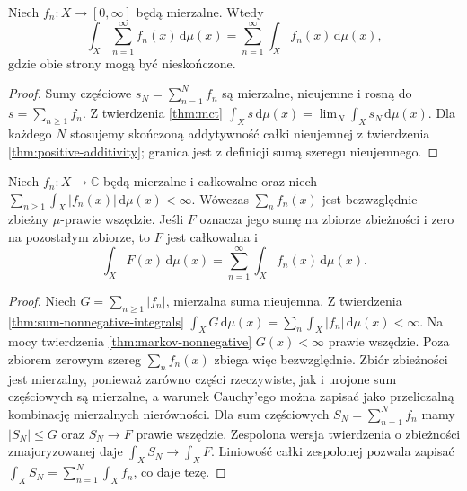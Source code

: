 \begin{twierdzenie}
\label{thm:sum-nonnegative-integrals}
Niech $f_n:X\to[0,\infty]$ będą mierzalne. Wtedy
\begin{equation}\label{eq:sum-nonnegative-integrals}
\int_X\sum_{n=1}^{\infty}f_n(x)\,\mathrm d\mu(x)
=\sum_{n=1}^{\infty}\int_Xf_n(x)\,\mathrm d\mu(x),
\end{equation}
gdzie obie strony mogą być nieskończone.
\end{twierdzenie}
\begin{proof}
Sumy częściowe $s_N=\sum_{n=1}^N f_n$ są
mierzalne, nieujemne i rosną do
$s=\sum_{n\ge1}f_n$. Z twierdzenia \ref{thm:mct}
$\int_Xs\,\mathrm d\mu(x)=\lim_N\int_Xs_N\,\mathrm d\mu(x)$.
Dla każdego $N$ stosujemy skończoną addytywność
całki nieujemnej z twierdzenia
\ref{thm:positive-additivity}; granica jest
z definicji sumą szeregu nieujemnego.
\end{proof}

\begin{twierdzenie}
\label{thm:sum-absolutely-integrable}
Niech $f_n:X\to\mathbb C$ będą mierzalne i
całkowalne oraz niech
$\sum_{n\ge1}\int_X|f_n(x)|\,\mathrm d\mu(x)<\infty$.
Wówczas $\sum_nf_n(x)$ jest bezwzględnie zbieżny
$\mu$-prawie wszędzie. Jeśli $F$ oznacza jego sumę
na zbiorze zbieżności i zero na pozostałym zbiorze,
to $F$ jest całkowalna i
\begin{equation}\label{eq:interchange-series}
\int_XF(x)\,\mathrm d\mu(x)
=\sum_{n=1}^{\infty}\int_Xf_n(x)\,\mathrm d\mu(x).
\end{equation}
\end{twierdzenie}
\begin{proof}
Niech $G=\sum_{n\ge1}|f_n|$, mierzalna suma
nieujemna. Z twierdzenia
\ref{thm:sum-nonnegative-integrals}
$\int_XG\,\mathrm d\mu(x)=
\sum_n\int_X|f_n|\,\mathrm d\mu(x)<\infty$.
Na mocy twierdzenia \ref{thm:markov-nonnegative}
$G(x)<\infty$ prawie wszędzie. Poza zbiorem
zerowym szereg $\sum_nf_n(x)$ zbiega więc
bezwzględnie. Zbiór zbieżności jest mierzalny,
ponieważ zarówno części rzeczywiste, jak i
urojone sum częściowych są mierzalne, a warunek
Cauchy'ego można zapisać jako przeliczalną
kombinację mierzalnych nierówności.
Dla sum częściowych $S_N=\sum_{n=1}^Nf_n$
mamy $|S_N|\le G$ oraz $S_N\to F$ prawie wszędzie.
Zespolona wersja twierdzenia o zbieżności zmajoryzowanej
daje $\int_XS_N\to\int_XF$. Liniowość całki
zespolonej pozwala zapisać
$\int_XS_N=\sum_{n=1}^N\int_Xf_n$, co daje tezę.
\end{proof}

